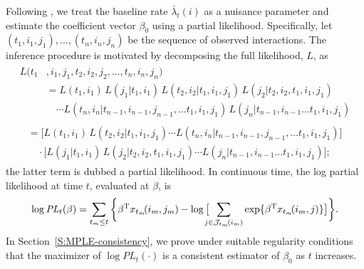 \documentclass[final]{statsoc}
\begin{document}
Following \citet{cox1975partial}, we treat the baseline rate
$\bar \lambda_t(i)$ as a nuisance parameter and estimate the coefficient
vector $\beta_0$ using a partial likelihood.  Specifically, let
$(t_1, i_1, j_1), \ldots, (t_n, i_n, j_n)$ be the sequence of observed
interactions.  The inference procedure is motivated by decomposing
the full likelihood, $L$, as
\begin{align*}
    \begin{split}
    L(t_1&, i_1, j_1, t_2, i_2, j_2, \ldots, t_n, i_n, j_n) \\
        &=
            L(t_1, i_1)
            \, L(j_1 | t_1, i_1)
            \, L(t_2, i_2 | t_1, i_1, j_1)
            \, L(j_2 | t_2, i_2, t_1, i_1, j_1) \\
        &\quad \cdots
            L(t_n, i_n | t_{n-1}, i_{n-1}, j_{n-1}, \ldots t_1, i_1, j_1)
            \, L(j_n | t_{n-1}, i_{n-1} \ldots t_1, i_1, j_1)
    \end{split} \\
    \begin{split}
        &=
            \Big[
                L(t_1, i_1)
                \, L(t_2, i_2 | t_1, i_1, j_1)
                \cdots
                L(t_n, i_n | t_{n-1}, i_{n-1}, j_{n-1}, \ldots t_1, i_1, j_1)
            \Big] \\
        &\quad
            \cdot
            \Big[
                L(j_1 | t_1, i_1)
                \, L(j_2 | t_2, i_2, t_1, i_1, j_1)
                \cdots
                L(j_n | t_{n-1}, i_{n-1} \ldots t_1, i_1, j_1)
            \Big];
    \end{split}
\end{align*}
the latter term is dubbed a partial likelihood.  In continuous time,
the log partial likelihood at time $t$, evaluated at $\beta$, is
\begin{equation}\label{E:log-pl}
    \log
    \mathit{PL}_t(\beta)
        =
        \sum_{t_m \leq t}
        \bigg\{
            \beta^{\mathrm{T}} x_{t_m}\!(i_m, j_m)
            -
            \log\big[
                \!\!\!\!
                \sum_{j \in \mathcal{J}_{t_m}\!(i_m)}
                    \exp\{ \beta^{\mathrm{T}} x_{t_m}\!(i_m, j)\}
            \big]
        \bigg\}.
\end{equation}
In Section~\ref{S:MPLE-consistency}, we prove under suitable regularity
conditions that the maximizer of $\log \mathit{PL}_t(\cdot)$ is a
consistent estimator of $\beta_0$ as $t$ increases.
\end{document}
